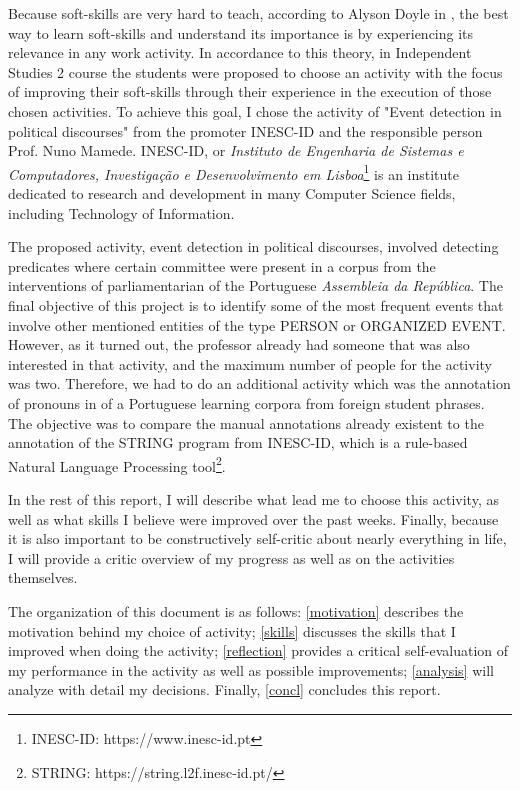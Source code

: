 \documentclass[a4paper,12pt,journal,twoside,compsoc]{PPIEEEtran}
\begin{document}
Because soft-skills are very hard to teach, according to Alyson Doyle in \cite{balance}, the best way to learn soft-skills and understand its importance is by experiencing its relevance in any work activity. In accordance to this theory, in Independent Studies 2 course the students were proposed to choose an activity with the focus of improving their soft-skills through their experience in the execution of those chosen activities. To achieve this goal, I chose the activity of "Event detection in political discourses" from the promoter INESC-ID and the responsible person Prof. Nuno Mamede. INESC-ID, or \textit{Instituto de Engenharia de Sistemas e Computadores, Investigação e Desenvolvimento em Lisboa}\footnote{INESC-ID: https://www.inesc-id.pt} is an institute dedicated to research and development in many Computer Science fields, including Technology of Information.

The proposed activity, event detection in political discourses, involved detecting predicates where certain committee were present in a corpus from the interventions of parliamentarian of the Portuguese \textit{Assembleia da República}. The final objective of this project is to identify some of the most frequent events that involve other mentioned entities of the type PERSON or ORGANIZED EVENT.
However, as it turned out, the professor already had someone that was also interested in that activity, and the maximum number of people for the activity was two. Therefore, we had to do an additional activity which was the annotation of pronouns in of a Portuguese learning corpora from foreign student phrases. The objective was to compare the manual annotations already existent to the annotation of the STRING program from INESC-ID, which is a rule-based Natural Language Processing tool\footnote{STRING: https://string.l2f.inesc-id.pt/}.

In the rest of this report, I will describe what lead me to choose this activity, as well as what skills I believe were improved over the past weeks. Finally, because it is also important to be constructively self-critic about nearly everything in life, I will provide a critic overview of my progress as well as on the activities themselves.

The organization of this document is as follows: \cref{motivation} describes the motivation behind my choice of activity; \cref{skills} discusses the skills that I improved when doing the activity; \cref{reflection} provides a critical self-evaluation of my performance in the activity as well as possible improvements; \cref{analysis} will analyze with detail my decisions. Finally, \cref{concl} concludes this report.
\end{document}
